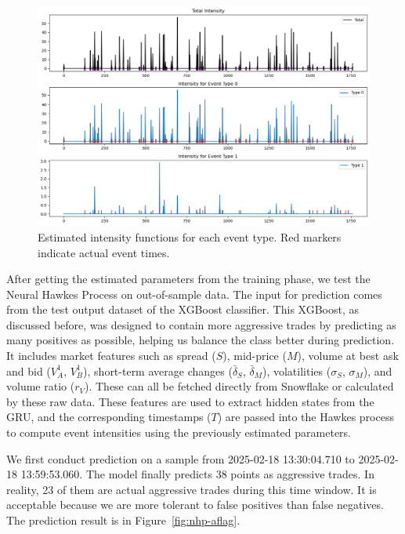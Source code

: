 \begin{figure}[H]
    \centering
    \includegraphics[width=0.95\linewidth]{figures/hp_estimation.png}
    \caption{Estimated intensity functions for each event type. Red markers indicate actual event times.}
    \label{fig:neuralhp-intensity}
\end{figure}

After getting the estimated parameters from the training phase, we test the Neural Hawkes Process on out-of-sample data. The input for prediction comes from the test output dataset of the XGBoost classifier. This XGBoost, as discussed before, was designed to contain more aggressive trades by predicting as many positives as possible, helping us balance the class better during prediction. It includes market features such as spread ($S$), mid-price ($M$), volume at best ask and bid ($V_A^1$, $V_B^1$), short-term average changes ($\bar{\delta}_S$, $\bar{\delta}_M$), volatilities ($\sigma_S$, $\sigma_M$), and volume ratio ($r_V$). These can all be fetched directly from Snowflake or calculated by these raw data. These features are used to extract hidden states from the GRU, and the corresponding timestamps ($T$) are passed into the Hawkes process to compute event intensities using the previously estimated parameters.

We first conduct prediction on a sample from 2025-02-18 13:30:04.710 to 2025-02-18 13:59:53.060. The model finally predicts 38 points as aggressive trades. In reality, 23 of them are actual aggressive trades during this time window. It is acceptable because we are more tolerant to false positives than false negatives. The prediction result is in Figure~\ref{fig:nhp-aflag}.

